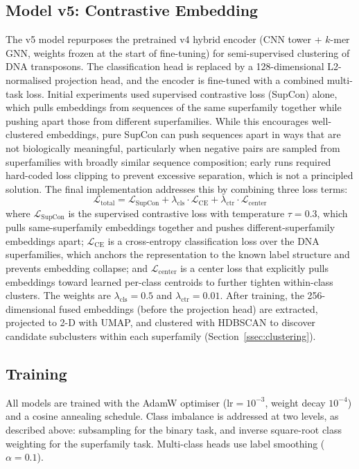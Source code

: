 \documentclass[12pt]{article}
\begin{document}
\subsection{Model v5: Contrastive Embedding}\label{ssec:methods_v5}

The v5 model repurposes the pretrained v4 hybrid encoder (CNN tower + $k$-mer GNN, weights frozen at the start of fine-tuning) for semi-supervised clustering of DNA transposons. The classification head is replaced by a 128-dimensional L2-normalised projection head, and the encoder is fine-tuned with a combined multi-task loss. Initial experiments used supervised contrastive loss (SupCon) alone, which pulls embeddings from sequences of the same superfamily together while pushing apart those from different superfamilies. While this encourages well-clustered embeddings, pure SupCon can push sequences apart in ways that are not biologically meaningful, particularly when negative pairs are sampled from superfamilies with broadly similar sequence composition; early runs required hard-coded loss clipping to prevent excessive separation, which is not a principled solution. The final implementation addresses this by combining three loss terms:
\[
\mathcal{L}_{\text{total}} = \mathcal{L}_{\text{SupCon}} + \lambda_{\text{cls}} \cdot \mathcal{L}_{\text{CE}} + \lambda_{\text{ctr}} \cdot \mathcal{L}_{\text{center}}
\]
where $\mathcal{L}_{\text{SupCon}}$ is the supervised contrastive loss \cite{khosla2020supervised} with temperature $\tau = 0.3$, which pulls same-superfamily embeddings together and pushes different-superfamily embeddings apart; $\mathcal{L}_{\text{CE}}$ is a cross-entropy classification loss over the DNA superfamilies, which anchors the representation to the known label structure and prevents embedding collapse; and $\mathcal{L}_{\text{center}}$ is a center loss that explicitly pulls embeddings toward learned per-class centroids to further tighten within-class clusters. The weights are $\lambda_{\text{cls}} = 0.5$ and $\lambda_{\text{ctr}} = 0.01$. After training, the 256-dimensional fused embeddings (before the projection head) are extracted, projected to 2-D with UMAP, and clustered with HDBSCAN to discover candidate subclusters within each superfamily (Section~\ref{ssec:clustering}).

\subsection{Training}\label{ssec:training}

All models are trained with the AdamW optimiser \cite{loshchilov2019decoupled} ($\mathrm{lr} = 10^{-3}$, weight decay $10^{-4}$) and a cosine annealing schedule. Class imbalance is addressed at two levels, as described above: subsampling for the binary task, and inverse square-root class weighting for the superfamily task. Multi-class heads use label smoothing ($\alpha = 0.1$).
\end{document}
